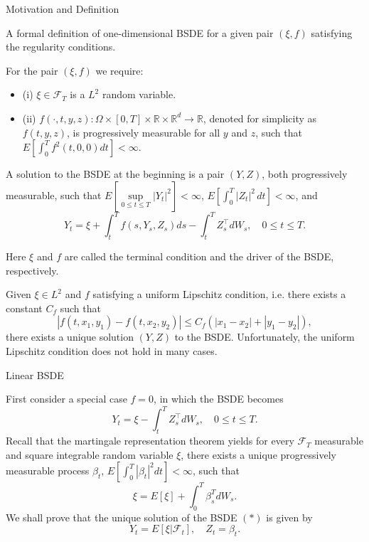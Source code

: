 \documentclass{beamer}
\begin{document}
\begin{frame}{Motivation and Definition}

    {\footnotesize \footnotesize

\par A formal definition of one-dimensional BSDE 
for a given pair \((\xi,f)\) satisfying the regularity conditions.
\par For the pair \((\xi,f)\) we require: 
\begin{itemize}
    \item  (i) \(\xi\in\mathcal{F}_{T}\) is a \(L^{2}\) random variable.
    \item (ii) \(f(\cdot,t,y,z):\Omega\times[0,T]\times\mathbb{R}\times\mathbb{R}^{d}\to \mathbb{R}\), denoted for simplicity as \(f(t,y,z)\), is progressively 
measurable for all \(y\) and \(z\), such that \(E[\int_{0}^{T}f^{2}(t,0,0)dt]<\infty\).
\end{itemize}
\par A solution to the BSDE at the beginning is a pair \((Y,Z)\), 
both progressively measurable, such that \(E[\sup\limits_{0\leq t\leq T}|Y_{t}|^{2}]<\infty\),
 \(E\left[\int_{0}^{T}|Z_{t}|^{2}\,dt\right]<\infty\), and
 \vspace{-1em}
\[
Y_{t}=\xi+\int_{t}^{T}f(s,Y_{s},Z_{s})ds-\int_{t}^{T}Z_{s}^{\top}dW_{s},\quad 0 \leq t \leq T.
\]
\par Here \(\xi\) and \(f\) are called the terminal condition and the driver of the BSDE, respectively.
\par Given \(\xi \in L^2\) and \(f\) satisfying a uniform Lipschitz condition, i.e. there exists a constant \(C_f\) such that  
\[
|f(t,x_1,y_1) - f(t,x_2,y_2)| \leq C_f \left( |x_1 - x_2| + |y_1 - y_2| \right),
\]  
there exists a unique solution \((Y,Z)\) to the BSDE. Unfortunately, the uniform Lipschitz 
condition does not hold in many cases.
    }
    
\end{frame}

\begin{frame}{Linear BSDE}

    {\footnotesize \footnotesize
    First consider a special case \(f = 0\), in which the BSDE becomes  
    \[
    Y_t = \xi - \int_{t}^{T} Z_s^{\top} dW_s, \quad 0 \leq t \leq T. \tag{*}
    \]
    Recall that the martingale representation theorem yields 
    for every \(\mathcal{F}_T\) measurable and square integrable 
    random variable \(\xi\), there exists a unique progressively measurable 
    process \(\beta_t\), \(E\left[\int_0^T |\beta_t|^2 dt\right] < \infty\), such that
\[
\xi = E[\xi] + \int_0^T \beta_s^T dW_s.
\]
We shall prove that the unique solution of the BSDE $(*)$ is given by
\[
Y_t = E[\xi|\mathcal{F}_t], \quad Z_t = \beta_t.
\]
    }
    
\end{frame}
\end{document}
